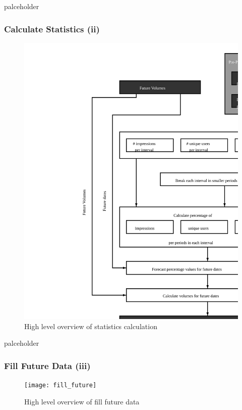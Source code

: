 palceholder

\subsubsection{Calculate Statistics (ii)}

\begin{figure}[h] \begin{center} \leavevmode
\includegraphics[]{calculate_stats} \caption{ High level overview
of statistics calculation} \label{fig:calculate_stats_ii} \end{center} \end{figure}

palceholder

\subsubsection{Fill Future Data (iii)}

\begin{figure}[h] \begin{center} \leavevmode
\texttt{[image: fill\_future]} \caption{ High level overview
of fill future data} \label{fig:fill_future_iii} \end{center} \end{figure}

